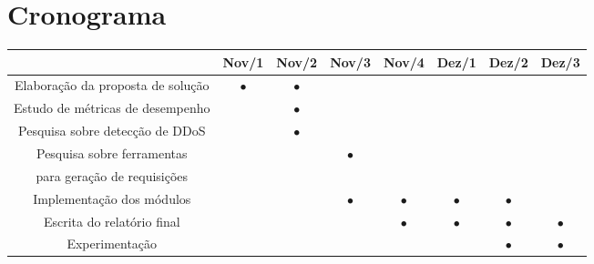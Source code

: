 \documentclass[a4paper, 12pt]{article}
\begin{document}
\section{Cronograma}

{\footnotesize
\center
\begin{table}[ht!]
\footnotesize
\center
\begin{tabular}{|c||c|c|c|c|c|c|c|}
\hline

      & \textbf{Nov/1} & \textbf{Nov/2} & \textbf{Nov/3} & \textbf{Nov/4} & \textbf{Dez/1} & \textbf{Dez/2} & \textbf{Dez/3} \\
\hline
\hline
Elaboração da proposta de solução      & $\bullet$ & $\bullet$ &  &  &  &  &  \\
\hline
Estudo de métricas de desempenho      &  & $\bullet$ &  &  &  & &  \\
\hline
Pesquisa sobre detecção de DDoS      &  & $\bullet$ &  &  &  &  &  \\
\hline
Pesquisa sobre ferramentas       &  &  & $\bullet$ &  &  &  &  \\
para geração de requisições       &   &   &   &   &   &   &   \\
\hline
Implementação dos módulos      &  &  & $\bullet$ & $\bullet$ & $\bullet$ & $\bullet$ &  \\
\hline
Escrita do relatório final      &  &   &  & $\bullet$  & $\bullet$ &  $\bullet$ & $\bullet$ \\
\hline
Experimentação      &  &  &  &  &  & $\bullet$ & $\bullet$ \\
\hline
\end{tabular}
\label{tab:crono}
\end{table}
}


% 


\end{document}
